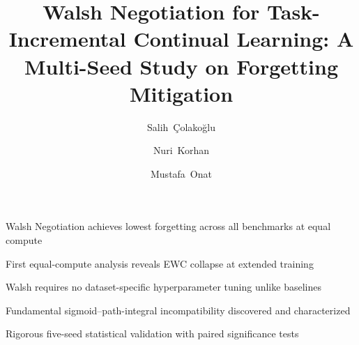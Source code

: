 \documentclass[preprint,review,12pt]{elsarticle}
\begin{document}
\begin{frontmatter}

\title{Walsh Negotiation for Task-Incremental Continual Learning: A Multi-Seed Study on Forgetting Mitigation}

\author[inst1]{Salih~\c{C}olako\u{g}lu\corref{}}
\author[inst2]{Nuri~Korhan}
\author[inst1]{Mustafa~Onat}




\begin{highlights}
\item Walsh Negotiation achieves lowest forgetting across all benchmarks at equal compute
\item First equal-compute analysis reveals EWC collapse at extended training
\item Walsh requires no dataset-specific hyperparameter tuning unlike baselines
\item Fundamental sigmoid--path-integral incompatibility discovered and characterized
\item Rigorous five-seed statistical validation with paired significance tests
\end{highlights}


\end{frontmatter}
\end{document}
